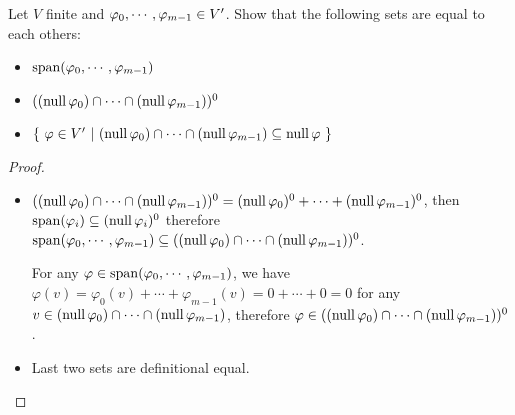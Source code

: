 \documentclass[../main.tex]{subfiles}
\begin{document}
\begin{exercise}
  Let $V$ finite and $\varphi_0 , \cdots , \varphi_{m - 1} \in V^\prime$. Show that the following sets are equal to each others:
  \begin{itemize}
    \item $\operatorname{span}(\varphi_0 , \cdots , \varphi_{m - 1})$
    \item $((\operatorname{null} \varphi_0) \cap \cdots \cap (\operatorname{null} \varphi_{m - 1}))^0$
    \item $\{ \ \varphi \in V^\prime \ | \ (\operatorname{null} \varphi_0) \cap \cdots \cap (\operatorname{null} \varphi_{m - 1}) \subseteq \operatorname{null} \varphi \ \}$
  \end{itemize}
\end{exercise}
\begin{proof}
  ~
  \begin{itemize}
    \item $((\operatorname{null} \varphi_0) \cap \cdots \cap (\operatorname{null} \varphi_{m - 1}))^0 = (\operatorname{null} \varphi_0)^0 + \cdots + (\operatorname{null} \varphi_{m - 1})^0$,
          then $\operatorname{span}(\varphi_i) \subseteq (\operatorname{null} \varphi_i)^0$ therefore $\operatorname{span}(\varphi_0 , \cdots , \varphi_{m - 1}) \subseteq ((\operatorname{null} \varphi_0) \cap \cdots \cap (\operatorname{null} \varphi_{m - 1}))^0$.
          
          For any $\varphi \in \operatorname{span}(\varphi_0 , \cdots , \varphi_{m - 1})$, we have $\varphi(v) = \varphi_0(v) + \cdots + \varphi_{m - 1}(v) = 0 + \cdots + 0 = 0$
          for any $v \in (\operatorname{null} \varphi_0) \cap \cdots \cap (\operatorname{null} \varphi_{m - 1})$, therefore $\varphi \in ((\operatorname{null} \varphi_0) \cap \cdots \cap (\operatorname{null} \varphi_{m - 1}))^0$.
    \item Last two sets are definitional equal.
  \end{itemize}
\end{proof}
\end{document}
